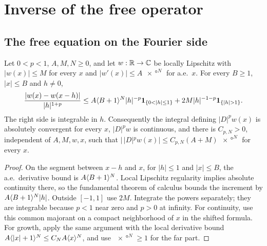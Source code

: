 \section{Inverse of the free operator}

\subsection{The free equation on the Fourier side}

\begin{lemma}
  \label{lem:c08_frac_shift_majorant}
  Let $0<p<1$, $A,M,N\ge0$, and let $w:\mathbb{R}\to\mathbb{C}$ be locally Lipschitz with
  $|w(x)|\le M$ for every $x$ and $|w'(x)|\le A\ang{x}^N$ for a.e.\ $x$.
  For every $B\ge1$, $|x|\le B$ and $h\ne0$,
  \[
    \frac{|w(x)-w(x-h)|}{|h|^{1+p}}\le
    A\ang{B+1}^N|h|^{-p}\mathbf1_{\{0<|h|\le1\}}
      +2M|h|^{-1-p}\mathbf1_{\{|h|>1\}}.
  \]
  The right side is integrable in $h$. Consequently the integral defining $|D|^pw(x)$ is absolutely
  convergent for every $x$, $|D|^pw$ is continuous, and there is $C_{p,N}>0$, independent of $A,M,w,x$,
  such that $|\,|D|^pw(x)|\le C_{p,N}(A+M)\ang{x}^N$ for every $x$.
\end{lemma}
\begin{proof}
  On the segment between $x-h$ and $x$, for $|h|\le1$ and $|x|\le B$, the a.e.\ derivative bound is
  $A\langle B+1 \rangle^N$. Local Lipschitz regularity implies absolute continuity there, so the fundamental
  theorem of calculus bounds the increment by $A\langle B+1 \rangle^N|h|$. Outside $[-1,1]$ use $2M$.
  Integrate the powers separately; they are integrable because $p<1$ near zero and $p>0$ at infinity.
  For continuity, use this common majorant on a compact neighborhood of $x$ in the shifted formula.
  For growth, apply the same argument with the local derivative bound
  $A\langle |x|+1 \rangle^N\le C_NA\langle x \rangle^N$, and use $\ang{x}^N\ge1$ for the far part.
\end{proof}

